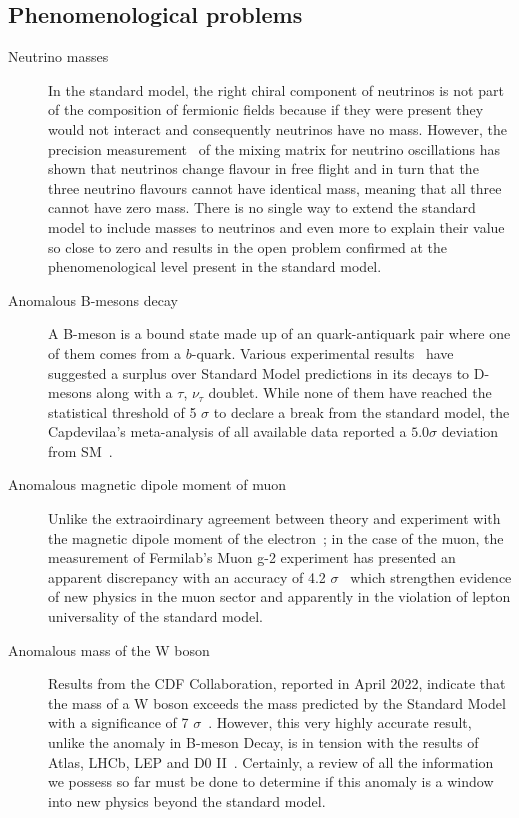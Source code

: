 \subsection{Phenomenological problems}\label{pheno_bsm}
\begin{description}
	\item[Neutrino masses] In the standard model, the right chiral component of neutrinos is not part of the composition of fermionic fields because if they were present they would not interact and consequently neutrinos have no mass. However, the precision measurement~\parencite{Abe_2008} of the mixing matrix for neutrino oscillations has shown that neutrinos change flavour in free flight and in turn that the three neutrino flavours cannot have identical mass, meaning that all three cannot have zero mass. There is no single way to extend the standard model to include masses to neutrinos and even more to explain their value so close to zero and results in the open problem confirmed at the phenomenological level present in the standard model.
	\item[Anomalous B-mesons decay] A B-meson is a bound state made up of an quark-antiquark pair where one of them comes from a $b$-quark. Various experimental results~\parencite{PhysRevLett.109.101802, PhysRevLett.115.111803,Altmannshofer_2015, Hurth_2016,arxiv.2103.11769} have suggested a surplus over Standard Model predictions in its decays to D-mesons along with a $\tau$, $\nu_\tau$ doublet. While none of them have reached the statistical threshold of 5 $\sigma$ to declare a break from the standard model, the Capdevilaa's meta-analysis of all available data reported a $5.0\sigma$ deviation from SM~\parencite{Capdevila_2018}. 
	\item[Anomalous magnetic dipole moment of muon]  Unlike the extraoirdinary agreement between theory and experiment with the magnetic dipole moment of the electron~\parencite{PhysRevLett.97.030801}; in the case of the muon, the measurement of Fermilab's Muon g-2 experiment has presented an apparent discrepancy  with an accuracy of 4.2 $\sigma$~\parencite{arxiv.1311.2198, Abi_2021} which strengthen evidence of new physics in the muon sector and apparently in the violation of lepton universality of the standard model. 
	\item[Anomalous mass of the W boson] Results from the CDF Collaboration, reported in April 2022, indicate that the mass of a W boson exceeds the mass predicted by the Standard Model with a significance of 7 $\sigma$~\parencite{abk1781}. However, this very highly accurate result, unlike the anomaly in B-meson Decay, is in tension with the results of Atlas, LHCb, LEP and D0 II~\parencite{Aaboud_2018,jhep012022036,Schael_2006,Abazov_2012,}. Certainly, a review of all the information we possess so far must be done to determine if this anomaly is a window into new physics beyond the standard model.

\end{description}
